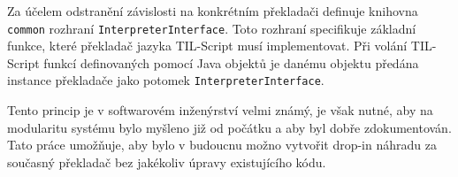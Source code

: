 Za účelem odstranění závislosti na konkrétním překladači definuje knihovna \lstinline{common}
rozhraní \lstinline{InterpreterInterface}. Toto rozhraní specifikuje základní funkce, které
překladač jazyka TIL-Script musí implementovat. Při volání TIL-Script funkcí definovaných pomocí
Java objektů je danému objektu předána instance překladače jako potomek
\lstinline{InterpreterInterface}.

Tento princip je v softwarovém inženýrství velmi známý, je však nutné, aby na modularitu systému
bylo myšleno již od počátku a aby byl dobře zdokumentován. Tato práce umožňuje, aby bylo v budoucnu
možno vytvořit drop-in náhradu za současný překladač bez jakékoliv úpravy existujícího kódu.

\endinput
